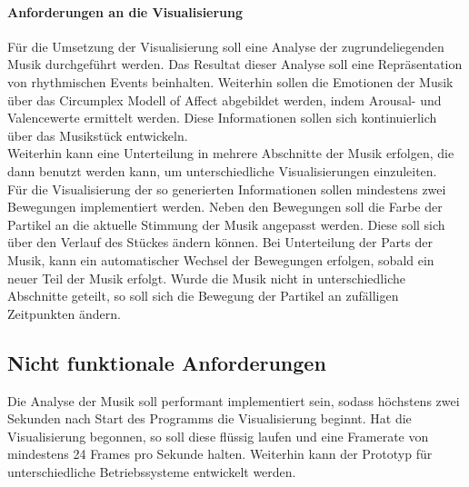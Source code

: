 \documentclass[11pt,a4paper]{article}
\begin{document}
\paragraph{Anforderungen an die Visualisierung}
Für die Umsetzung der Visualisierung soll eine Analyse der zugrundeliegenden Musik durchgeführt werden. Das Resultat dieser Analyse soll eine Repräsentation von rhythmischen Events beinhalten. Weiterhin sollen die Emotionen der Musik über das Circumplex Modell of Affect abgebildet werden, indem Arousal- und Valencewerte ermittelt werden. Diese Informationen sollen sich kontinuierlich über das Musikstück entwickeln.\\
Weiterhin kann eine Unterteilung in mehrere Abschnitte der Musik erfolgen, die dann benutzt werden kann, um unterschiedliche Visualisierungen einzuleiten.\\
Für die Visualisierung der so generierten Informationen sollen mindestens zwei Bewegungen implementiert werden. Neben den Bewegungen soll die Farbe der Partikel an die aktuelle Stimmung der Musik angepasst werden. Diese soll sich über den Verlauf des Stückes ändern können. Bei Unterteilung der Parts der Musik, kann ein automatischer Wechsel der Bewegungen erfolgen, sobald ein neuer Teil der Musik erfolgt. Wurde die Musik nicht in unterschiedliche Abschnitte geteilt, so soll sich die Bewegung der Partikel an zufälligen Zeitpunkten ändern.

\subsection{Nicht funktionale Anforderungen}
Die Analyse der Musik soll performant implementiert sein, sodass höchstens zwei Sekunden nach Start des Programms die Visualisierung beginnt. Hat die Visualisierung begonnen, so soll diese flüssig laufen und eine Framerate von mindestens 24 Frames pro Sekunde halten. Weiterhin kann der Prototyp für unterschiedliche Betriebssysteme entwickelt werden.
\end{document}
